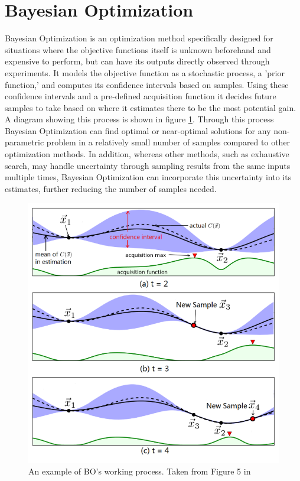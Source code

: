 \documentclass{report}
\begin{document}
\section{Bayesian Optimization}
Bayesian Optimization is an optimization method specifically designed for situations where the objective functions itself is unknown beforehand and expensive to perform, but can have its outputs directly observed through experiments\cite{Snoek2012}. It models the objective function as a stochastic process, a 'prior function,' and computes its confidence intervals based on samples. Using these confidence intervals and a pre-defined acquisition function it decides future samples to take based on where it estimates there to be the most potential gain. A diagram showing this process is shown in figure \ref{fig:cherrypic}. Through this process Bayesian Optimization can find optimal or near-optimal solutions for any non-parametric problem in a relatively small number of samples compared to other optimization methods. In addition, whereas other methods, such as exhaustive search, may handle uncertainty through sampling results from the same inputs multiple times, Bayesian Optimization can incorporate this uncertainty into its estimates, further reducing the number of samples needed.

\begin{figure}[!hb]
  \centering
   \includegraphics[scale=0.5]{Cherrypic}
  \caption{An example of BO's working process. Taken from Figure 5 in \cite{Alipourfard2017}}
  \label{fig:cherrypic}
\end{figure}
\end{document}
